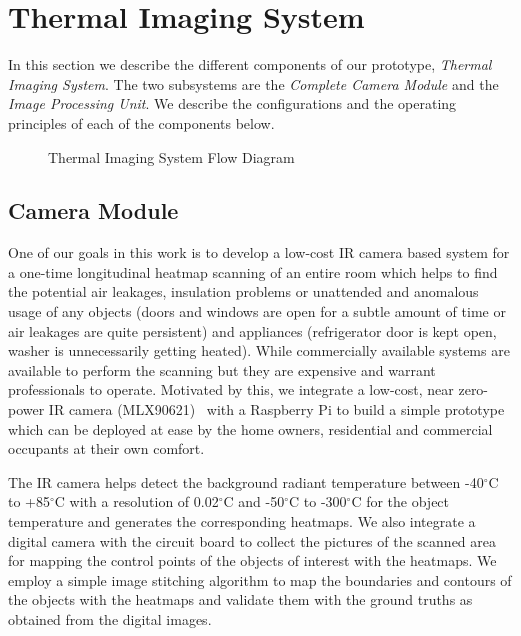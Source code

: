 \section{Thermal Imaging System}
In this section we describe the different components of our prototype, {\it Thermal Imaging System}. The two subsystems are the {\it Complete Camera Module} and the {\it Image Processing Unit}. We describe the configurations and the operating principles of each of the components below.
	\begin{figure}[!htb]
\begin{center}
 \caption{Thermal Imaging System Flow Diagram}
 \label{fig:Flow}
\end{center}
\end{figure}
	
	
\subsection{Camera Module}
\label{sec:camera}

One of our goals in this work is to develop a low-cost IR camera based system for a one-time longitudinal heatmap scanning of an entire room which helps to find the potential air leakages, insulation problems or unattended and anomalous usage of any objects (doors and windows are open for a subtle amount of time or air leakages are quite persistent) and appliances (refrigerator door is kept open, washer is unnecessarily getting heated). While commercially available systems are available to perform the scanning but they are expensive and warrant professionals to operate. Motivated by this, we integrate a low-cost, near zero-power IR camera (MLX90621)~\cite{XX} with a Raspberry Pi to build a simple prototype which can be deployed at ease by the home owners, residential and commercial occupants at their own comfort. 

The IR camera helps detect the background radiant temperature between -40$^{\circ}$C to +85$^{\circ}$C with a resolution of 0.02$^{\circ}$C and -50$^{\circ}$C to -300$^{\circ}$C for the object temperature and generates the corresponding heatmaps. We also integrate a digital camera with the circuit board to collect the  pictures of the scanned area for mapping the control points of the objects of interest with the heatmaps. We employ a simple image stitching algorithm to map the boundaries and contours of the objects with the heatmaps and validate them with the ground truths as obtained from the digital images. 

